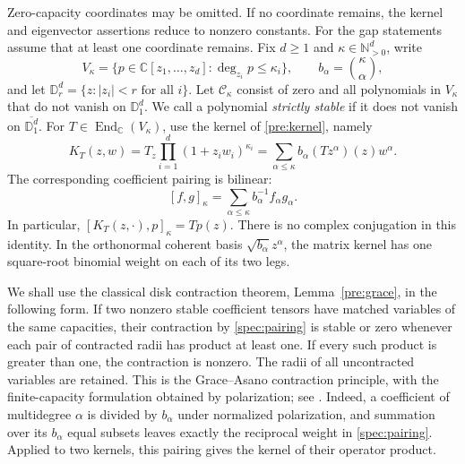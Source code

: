 \documentclass[reqno]{amsart}
\theoremstyle{definition}
\theoremstyle{remark}
\newcommand{\C}{\mathbb C}
\newcommand{\N}{\mathbb N}
\newcommand{\D}{\mathbb D}
\begin{document}
Zero-capacity coordinates may be omitted.  If no coordinate remains,
the kernel and eigenvector assertions reduce to nonzero constants.
For the gap statements assume that at least one coordinate remains.
Fix \(d\ge1\) and \(\kappa\in\N_{>0}^d\), write
\[
 V_\kappa=\{p\in\C[z_1,\ldots,z_d]:\deg_{z_i}p\le\kappa_i\},
 \qquad b_\alpha=\binom\kappa\alpha,
\]
and let \(\D_r^d=\{z:|z_i|<r\text{ for all }i\}\).
Let \(\mathcal C_\kappa\) consist of zero and all polynomials in
\(V_\kappa\) that do not vanish on \(\D_1^d\).  We call a polynomial
\emph{strictly stable} if it does not vanish on \(\overline{\D_1^d}\).
For \(T\in\operatorname{End}_{\C}(V_\kappa)\), use the kernel
of \eqref{pre:kernel}, namely
\begin{equation}\label{spec:kernel}
 K_T(z,w)=T_z\prod_{i=1}^d(1+z_iw_i)^{\kappa_i}
 =\sum_{\alpha\le\kappa}b_\alpha(Tz^\alpha)(z)w^\alpha.
\end{equation}
The corresponding coefficient pairing is bilinear:
\begin{equation}\label{spec:pairing}
 [f,g]_\kappa=\sum_{\alpha\le\kappa}b_\alpha^{-1}f_\alpha g_\alpha.
\end{equation}
In particular, \([K_T(z,\cdot),p]_\kappa=Tp(z)\).  There is no
complex conjugation in this identity.  In the orthonormal coherent basis
\(\sqrt{b_\alpha}z^\alpha\), the matrix kernel has one square-root
binomial weight on each of its two legs.

We shall use the classical disk contraction theorem, Lemma~\ref{pre:grace},
in the following form.
If two nonzero stable coefficient tensors have matched variables of the
same capacities, their contraction by \eqref{spec:pairing} is stable or
zero whenever each pair of contracted radii has product at least one.
If every such product is greater than one, the contraction is nonzero.
The radii of all uncontracted variables are retained.  This is the
Grace--Asano contraction principle, with the finite-capacity formulation
obtained by polarization; see \cite{BB09,BB10II,WBG26}.  Indeed, a
coefficient of multidegree \(\alpha\) is divided by \(b_\alpha\)
under normalized polarization, and summation over its \(b_\alpha\)
equal subsets leaves exactly the reciprocal weight in
\eqref{spec:pairing}.  Applied to two kernels, this pairing gives the
kernel of their operator product.
\end{document}
